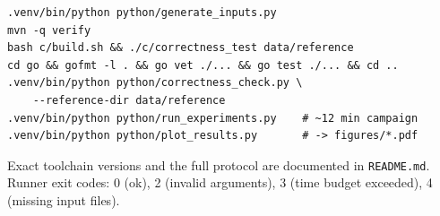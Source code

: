\documentclass[11pt,a4paper]{article}
\begin{document}
\begin{verbatim}
.venv/bin/python python/generate_inputs.py
mvn -q verify
bash c/build.sh && ./c/correctness_test data/reference
cd go && gofmt -l . && go vet ./... && go test ./... && cd ..
.venv/bin/python python/correctness_check.py \
    --reference-dir data/reference
.venv/bin/python python/run_experiments.py    # ~12 min campaign
.venv/bin/python python/plot_results.py       # -> figures/*.pdf
\end{verbatim}

Exact toolchain versions and the full protocol are documented in
\texttt{README.md}. Runner exit codes: 0 (ok), 2 (invalid arguments), 3 (time
budget exceeded), 4 (missing input files).
\end{document}
